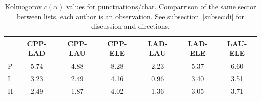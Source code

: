 \documentclass[%
 aip,
 jmp,%
 amsmath,amssymb,
 reprint,%
]{revtex4-1}
\begin{document}
\begin{table}
  \centering
    \small
\setlength{\tabcolsep}{.06667em}
  \begin{tabular}{|l|| c|c|c|c|c|c|}\hline
 & CPP-LAD & CPP-LAU & CPP-ELE & LAD-LAU & LAD-ELE & LAU-ELE \\\hline
P & 5.74 & 4.88 & 8.28 & 2.23 & 5.37 & 6.60 \\\hline
I & 3.23 & 2.49 & 4.16 & 0.96 & 3.40 & 3.51 \\\hline
H & 2.49 & 1.87 & 4.02 & 1.36 & 3.05 & 3.71 \\\hline
  \end{tabular}
  \caption{Kolmogorov $c(\alpha)$ values for punctuations/char. Comparrison of the same sector between lists, each author is an observation. See subsection~\ref{subsec:di} for discussion and directions.}
  \label{tab:kolPctInter}
\end{table}
\end{document}
